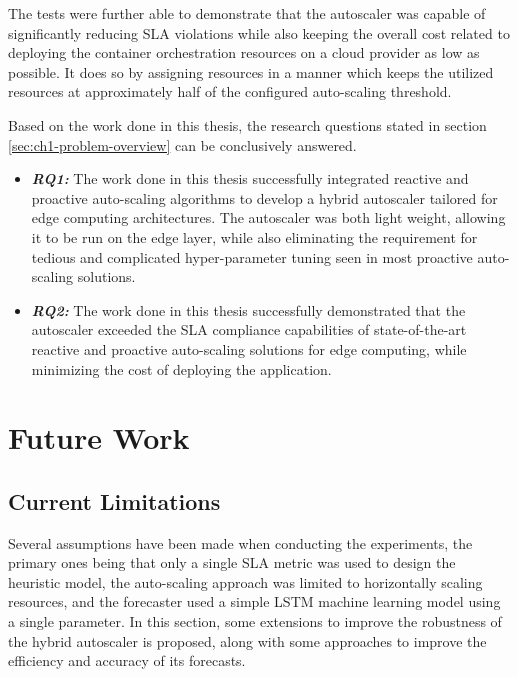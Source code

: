 The tests were further able to demonstrate that the autoscaler was capable of significantly reducing SLA violations while also keeping the overall cost related to deploying the container orchestration resources on a cloud provider as low as possible. It does so by assigning resources in a manner which keeps the utilized resources at approximately half of the configured auto-scaling threshold.\par

Based on the work done in this thesis, the research questions stated in section \ref{sec:ch1-problem-overview} can be conclusively answered.

\begin{itemize}
    \item \textbf{\textit{RQ1:}} The work done in this thesis successfully integrated reactive and proactive auto-scaling algorithms to develop a hybrid autoscaler tailored for edge computing architectures. The autoscaler was both light weight, allowing it to be run on the edge layer, while also eliminating the requirement for tedious and complicated hyper-parameter tuning seen in most proactive auto-scaling solutions.
    \item \textbf{\textit{RQ2:}} The work done in this thesis successfully demonstrated that the autoscaler exceeded the SLA compliance capabilities of state-of-the-art reactive and proactive auto-scaling solutions for edge computing, while minimizing the cost of deploying the application.
\end{itemize}

\section{Future Work}
\label{sec:ch7-future-work}

\subsection{Current Limitations}
\label{subsec:ch7-limitations}

Several assumptions have been made when conducting the experiments, the primary ones being that only a single SLA metric was used to design the heuristic model, the auto-scaling approach was limited to horizontally scaling resources, and the forecaster used a simple LSTM machine learning model using a single parameter. In this section, some extensions to improve the robustness of the hybrid autoscaler is proposed, along with some approaches to improve the efficiency and accuracy of its forecasts.\par

